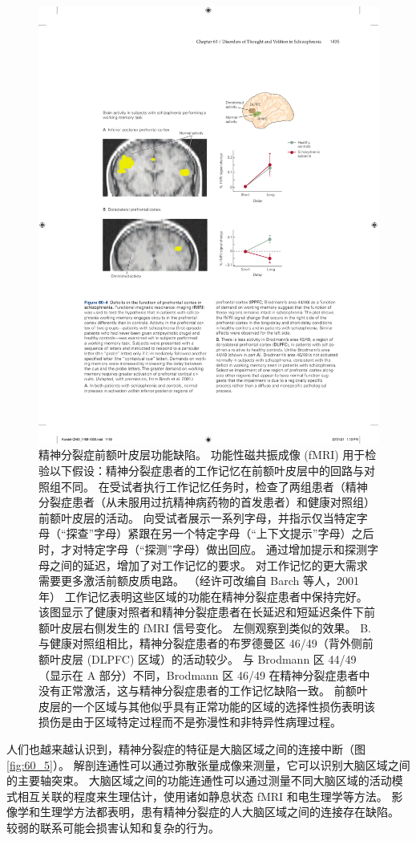 \begin{figure}[htbp]
	\centering
	\includegraphics[width=0.8\linewidth]{chap60/fig_60_4}
	\caption{精神分裂症前额叶皮层功能缺陷。 功能性磁共振成像 (fMRI) 用于检验以下假设：精神分裂症患者的工作记忆在前额叶皮层中的回路与对照组不同。 在受试者执行工作记忆任务时，检查了两组患者（精神分裂症患者（从未服用过抗精神病药物的首发患者）和健康对照组）前额叶皮层的活动。 向受试者展示一系列字母，并指示仅当特定字母（“探查”字母）紧跟在另一个特定字母（“上下文提示”字母）之后时，才对特定字母（“探测”字母）做出回应。 通过增加提示和探测字母之间的延迟，增加了对工作记忆的要求。 对工作记忆的更大需求需要更多激活前额皮质电路。 （经许可改编自 Barch 等人，2001 年） 工作记忆表明这些区域的功能在精神分裂症患者中保持完好。 该图显示了健康对照者和精神分裂症患者在长延迟和短延迟条件下前额叶皮层右侧发生的 fMRI 信号变化。 左侧观察到类似的效果。 B. 与健康对照组相比，精神分裂症患者的布罗德曼区 46/49（背外侧前额叶皮层 (DLPFC) 区域）的活动较少。 与 Brodmann 区 44/49（显示在 A 部分）不同，Brodmann 区 46/49 在精神分裂症患者中没有正常激活，这与精神分裂症患者的工作记忆缺陷一致。 前额叶皮层的一个区域与其他似乎具有正常功能的区域的选择性损伤表明该损伤是由于区域特定过程而不是弥漫性和非特异性病理过程。}
	\label{fig:60_4}
\end{figure}

人们也越来越认识到，精神分裂症的特征是大脑区域之间的连接中断（图 \ref{fig:60_5}）。 解剖连通性可以通过弥散张量成像来测量，它可以识别大脑区域之间的主要轴突束。 大脑区域之间的功能连通性可以通过测量不同大脑区域的活动模式相互关联的程度来生理估计，使用诸如静息状态 fMRI 和电生理学等方法。 影像学和生理学方法都表明，患有精神分裂症的人大脑区域之间的连接存在缺陷。 较弱的联系可能会损害认知和复杂的行为。

